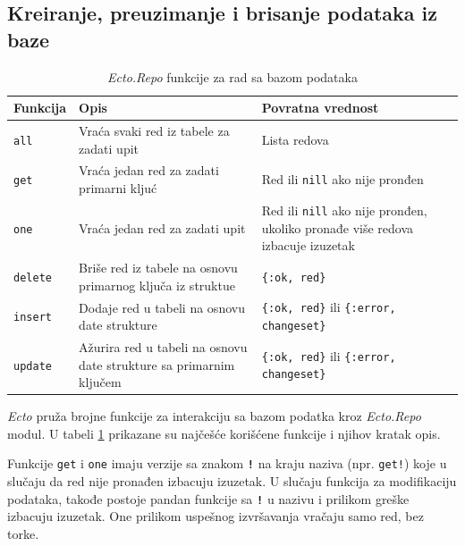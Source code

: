 \documentclass[12pt,oneside]{memoir}
\begin{document}
\subsection{Kreiranje, preuzimanje i brisanje podataka iz baze}
\begin{table}[h!]
  \renewcommand*{\arraystretch}{1.4}
  \small
  \centering
  \begin{tabular}{p{} | p{} | p{}}
    Funkcija & Opis & Povratna vrednost\\ [0.5ex] 
    \hline
    \texttt{all} & Vraća svaki red iz tabele za zadati upit & Lista redova \\ 
    \texttt{get} & Vraća jedan red za zadati primarni kljuć & Red ili \texttt{nill} ako nije pronđen  \\
    \texttt{one} & Vraća jedan red za zadati upit &  Red ili \texttt{nill} ako nije pronđen, ukoliko pronađe više redova izbacuje izuzetak \\
    \hline
    \texttt{delete} & Briše red iz tabele na osnovu primarnog ključa iz struktue & \texttt{\{:ok, red\}} \\ 
    \texttt{insert} & Dodaje red u tabeli na osnovu date strukture & \texttt{\{:ok, red\}} ili \texttt{\{:error, changeset\}}\\
    \texttt{update} & Ažurira red u tabeli na osnovu date strukture sa primarnim ključem & \texttt{\{:ok, red\}} ili \texttt{\{:error, changeset\}} \\
  \end{tabular}
  \caption{\emph{Ecto.Repo} funkcije za rad sa bazom podataka}
  \label{table:repoFuntions}
  \end{table}
\emph{Ecto} pruža brojne funkcije za interakciju sa bazom podatka kroz \emph{Ecto.Repo} modul.
U tabeli \ref{table:repoFuntions} prikazane su najčešće korišćene funkcije i njihov kratak opis.

Funkcije \texttt{get} i \texttt{one} imaju verzije sa znakom \texttt{\textbf{!}}
na kraju naziva (npr. \texttt{get!}) koje u slučaju da red nije pronađen izbacuju izuzetak.
U slučaju funkcija za modifikaciju podataka, takođe postoje pandan funkcije sa \texttt{\textbf{!}} u nazivu
i prilikom greške izbacuju izuzetak. One prilikom uspešnog izvršavanja vračaju samo red, bez torke.
\end{document}
